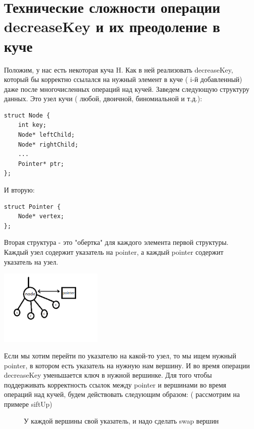 \section{Технические сложности операции decreaseKey и их преодоление в куче} 

Положим, у нас есть некоторая куча H. Как в ней реализовать decreaseKey, который бы корректно ссылался на нужный элемент в куче ( i-й добавленный) даже после многочисленных операций над кучей. Заведем следующую структуру данных. Это узел кучи ( любой, двоичной, биномиальной и т.д.):
\begin{lstlisting}
struct Node {
	int key;
	Node* leftChild;
	Node* rightChild;
	...
	Pointer* ptr;
};
\end{lstlisting}
И вторую: 
\begin{lstlisting}
struct Pointer {
	Node* vertex;
};
\end{lstlisting}
Вторая структура - это "обертка" для каждого элемента первой структуры. Каждый узел содержит указатель на pointer, а каждый pointer  содержит указатель на узел.

\includegraphics[width = 5cm]{images/29_1}

Если мы хотим перейти по указателю на какой-то узел, то мы ищем нужный pointer, в котором есть указатель на нужную нам вершину. И во время операции decreaseKey уменьшается ключ в нужной вершинке.
Для того чтобы поддерживать корректность ссылок между pointer и вершинами во время операций над кучей, будем действовать следующим образом: ( рассмотрим на примере siftUp)
\begin{figure}[h]
\caption {У каждой вершины свой указатель, и надо сделать swap вершин}
\label{ris:image}
\end{figure}

